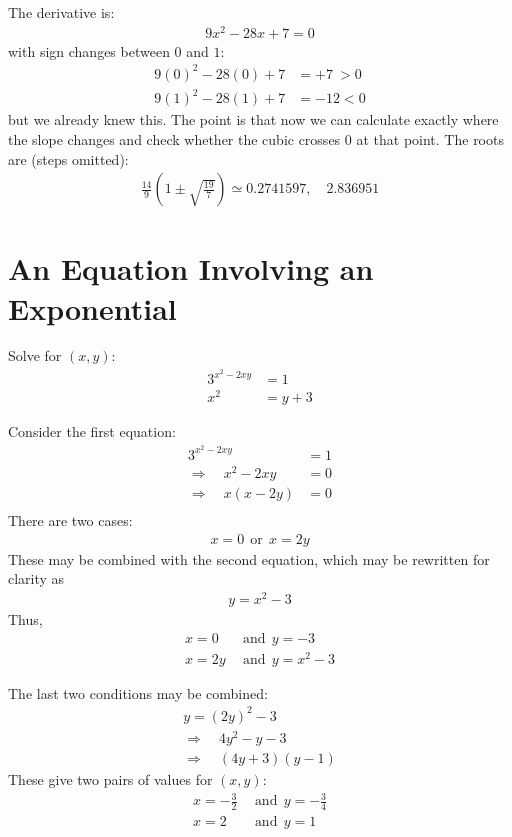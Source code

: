 \documentclass[12pt]{article}
\begin{document}
\begin{answer}
The derivative is:
\begin{align*}
9 x^{2} - 28 x + 7 = 0
\end{align*}
with sign changes between $0$ and $1$:
\begin{align*}
9(0)^{2} - 28(0) + 7 & = +7 ~ > 0 \\
9(1)^{2} - 28(1) + 7 & = -12 < 0 
\end{align*}
but we already knew this. The point is that now we can calculate exactly where the slope changes and check whether the cubic crosses $0$ at that point. The roots are (steps omitted):
\begin{align*}
\frac{14}{9} \left(1 \pm \sqrt{\frac{19}{7}}\right) 
\simeq 0.2741597, \hspace{1em} 2.836951 
\end{align*}

\end{answer}


\section*{An Equation Involving an Exponential}
Solve for $(x,y)$:
\begin{align*}
3^{x^{2}-2xy} & = 1 \\
x^{2} & = y + 3
\end{align*}

\begin{answer}
Consider the first equation:
\begin{align*}
3^{x^{2}-2xy} & = 1 \\
\Rightarrow \hspace{1em} 
x^{2}-2xy & = 0 \\
\Rightarrow \hspace{1em} 
x(x-2y) & = 0 \\
\end{align*}
There are two cases:
\begin{align*}
x = 0 ~~\text{or}~~ x=2y
\end{align*}
These may be combined with the second equation, which may be rewritten for clarity as
\begin{align*}
y = x^{2} - 3
\end{align*}
Thus,
\begin{align*}
x = 0 & ~~\text{and}~~ y = -3 \\
x = 2y & ~~\text{and}~~ y = x^{2} - 3
\end{align*}

The last two conditions may be combined:
\begin{align*}
y = (2y)^{2} - 3 \\
\Rightarrow \hspace{1em} 
4 y^{2} - y - 3 \\
\Rightarrow \hspace{1em} 
(4y + 3) (y - 1)
\end{align*}
These give two pairs of values for $(x,y)$:
\begin{align*}
x = -\frac{3}{2} & ~~\text{and}~~ y = -\frac{3}{4} \\
x = 2 & ~~\text{and}~~ y = 1
\end{align*}
\end{answer}
\end{document}
